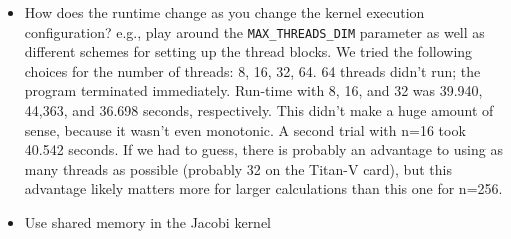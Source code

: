 \documentclass[11pt]{article}
\begin{document}
\begin{itemize}
      \item How does the runtime change as you change the kernel execution configuration?
        e.g., play around the \texttt{MAX\_THREADS\_DIM} parameter as well as different schemes for setting up the thread blocks.
We tried the following choices for the number of threads: 8, 16, 32, 64.
64 threads didn't run; the program terminated immediately.
Run-time with 8, 16, and 32 was 39.940, 44,363, and 36.698 seconds, respectively.
This didn't make a huge amount of sense, because it wasn't even monotonic.
A second trial with n=16 took 40.542 seconds.
If we had to guess, there is probably an advantage to using as many threads as possible
(probably 32 on the Titan-V card), but this advantage likely matters more for larger calculations
than this one for n=256.
      \item Use shared memory in the Jacobi kernel
    \end{itemize}
\end{document}
